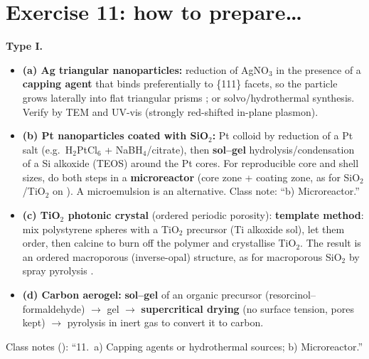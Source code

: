 \section{Exercise 11: how to prepare\ldots}
\textbf{Type I.}
\begin{itemize}
  \item \textbf{(a) Ag triangular nanoparticles:} reduction of AgNO$_3$ in the presence of a \textbf{capping agent} that binds
        preferentially to \{111\} facets, so the particle grows laterally into flat triangular prisms ;
        or solvo/hydrothermal synthesis. Verify by TEM and UV-vis (strongly red-shifted in-plane plasmon).
  \item \textbf{(b) Pt nanoparticles coated with SiO$_2$:} Pt colloid by reduction of a Pt salt (e.g.\ H$_2$PtCl$_6$ +
        NaBH$_4$/citrate), then \textbf{sol--gel} hydrolysis/condensation of a Si alkoxide (TEOS) around the Pt cores. For
        reproducible core and shell sizes, do both steps in a \textbf{microreactor} (core zone + coating zone, as for
        SiO$_2$/TiO$_2$ on ). A microemulsion is an alternative. Class note: ``b) Microreactor.''
  \item \textbf{(c) TiO$_2$ photonic crystal} (ordered periodic porosity): \textbf{template method}: mix polystyrene
        spheres with a TiO$_2$ precursor (Ti alkoxide sol), let them order, then calcine to burn off the polymer and
        crystallise TiO$_2$. The result is an ordered macroporous (inverse-opal) structure, as for macroporous SiO$_2$ by
        spray pyrolysis .
  \item \textbf{(d) Carbon aerogel:} \textbf{sol--gel} of an organic precursor (resorcinol--formaldehyde\extra) $\to$ gel $\to$
        \textbf{supercritical drying} (no surface tension, pores kept) $\to$ pyrolysis in inert gas to convert it to
        carbon\extra.
\end{itemize}
\begin{classbox}
Class notes (): ``11.\ a) Capping agents or hydrothermal sources; b) Microreactor.''
\end{classbox}

